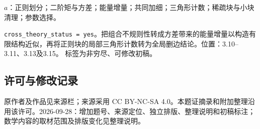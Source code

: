 \documentclass[UTF8,11pt]{ctexart}
\theoremstyle{definition}
\begin{document}
$a$：正则划分；二阶矩与方差；能量增量；共同加细；三角形计数；稀疏块与小块清理；参数选择。

\texttt{cross\_theory\_status = yes}。把组合不规则性转成方差带来的能量增量以构造有限结构近似，再将正则块的局部三角形计数转为全局删边结论。位置：3.10--3.11、3.13及3.15。
标签为非穷尽、可修改初稿。
\subsection*{许可与修改记录}
原作者及作品见来源栏；来源采用 CC BY-NC-SA 4.0。本题证摘录和附加整理沿用该许可。2026-09-28：增加题号、来源定位、独立排版、整理说明和初稿标注；数学内容的取材范围及排版变化见整理说明。
\end{document}
